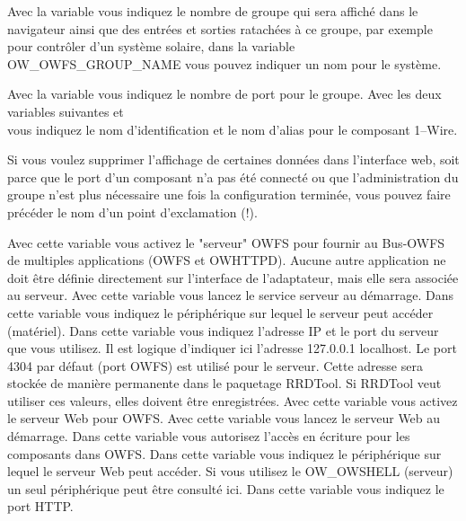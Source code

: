 \begin{description}
Avec la variable  vous indiquez le nombre de groupe qui sera
affiché dans le navigateur ainsi que des entrées et sorties ratachées à ce groupe,
par exemple pour contrôler d'un système solaire, dans la variable OW\_OWFS\_GROUP\_NAME
vous pouvez indiquer un nom pour le système.

Avec la variable  vous indiquez le nombre de port
pour le groupe. Avec les deux variables suivantes  et \\
 vous indiquez le nom d'identification et le nom
d'alias pour le composant 1--Wire.

Si vous voulez supprimer l'affichage de certaines données dans l'interface web, 
soit parce que le port d'un composant n'a pas été connecté ou que l'administration
du groupe n'est plus nécessaire une fois la configuration terminée, vous pouvez faire
précéder le nom d'un point d'exclamation (!).

Avec cette variable vous activez le "serveur" OWFS pour fournir au Bus-OWFS de multiples
applications (OWFS et OWHTTPD). Aucune autre application ne doit être définie directement
sur l'interface de l'adaptateur, mais elle sera associée au serveur.
Avec cette variable vous lancez le service serveur au démarrage.
Dans cette variable vous indiquez le périphérique sur lequel le serveur peut accéder
(matériel).
Dans cette variable vous indiquez l'adresse IP et le port du serveur que vous utilisez.
Il est logique d'indiquer ici l'adresse 127.0.0.1 localhost. Le port 4304 par défaut
(port OWFS) est utilisé pour le serveur. Cette adresse sera stockée de manière permanente
dans le paquetage RRDTool. Si RRDTool veut utiliser ces valeurs, elles doivent être enregistrées.
Avec cette variable vous activez le serveur Web pour OWFS.
Avec cette variable vous lancez le serveur Web au démarrage.
Dans cette variable vous autorisez l'accès en écriture pour les composants dans OWFS.
Dans cette variable vous indiquez le périphérique sur lequel le serveur Web peut
accéder. Si vous utilisez le OW\_OWSHELL (serveur) un seul périphérique peut être
consulté ici.
Dans cette variable vous indiquez le port HTTP.


\end{description}
